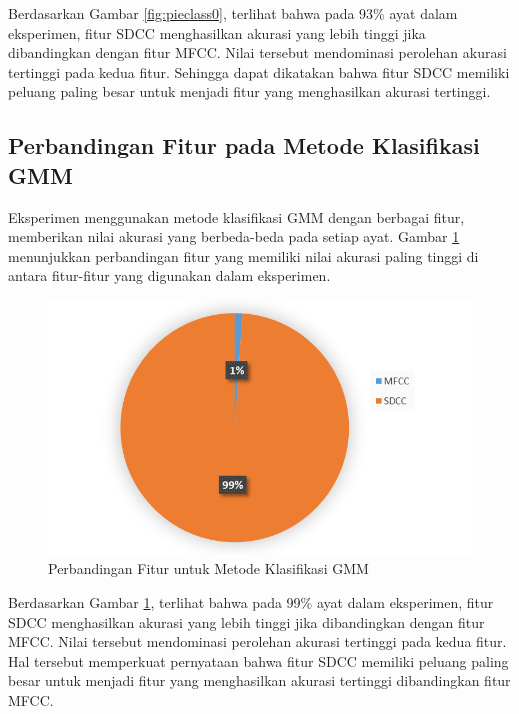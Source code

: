   Berdasarkan Gambar \ref{fig:pieclass0}, terlihat bahwa pada 93\% ayat dalam eksperimen, fitur SDCC menghasilkan akurasi yang lebih tinggi jika dibandingkan dengan fitur MFCC. Nilai tersebut mendominasi perolehan akurasi tertinggi pada kedua fitur. Sehingga dapat dikatakan bahwa fitur SDCC memiliki peluang paling besar untuk menjadi fitur yang menghasilkan akurasi tertinggi.








  \subsection{Perbandingan Fitur pada Metode Klasifikasi GMM}
  Eksperimen menggunakan metode klasifikasi GMM dengan berbagai fitur, memberikan nilai akurasi yang berbeda-beda pada setiap ayat. Gambar \ref{fig:pieclass1} menunjukkan perbandingan fitur yang memiliki nilai akurasi paling tinggi di antara fitur-fitur yang digunakan dalam eksperimen.

  \begin{figure}
    \centering
    \includegraphics[width=0.9\linewidth]{pics/pieclass1}
    \caption{Perbandingan Fitur untuk Metode Klasifikasi GMM}
    \label{fig:pieclass1}
  \end{figure}

  Berdasarkan Gambar \ref{fig:pieclass1}, terlihat bahwa pada 99\% ayat dalam eksperimen, fitur SDCC menghasilkan akurasi yang lebih tinggi jika dibandingkan dengan fitur MFCC. Nilai tersebut mendominasi perolehan akurasi tertinggi pada kedua fitur. Hal tersebut memperkuat pernyataan bahwa fitur SDCC memiliki peluang paling besar untuk menjadi fitur yang menghasilkan akurasi tertinggi dibandingkan fitur MFCC.




